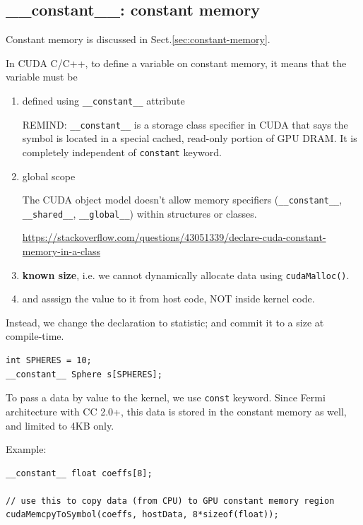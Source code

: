 \subsection{\_\_constant\_\_: constant memory}
\label{sec:cudac_constant}
\label{sec:constant_CUDA-C}
\label{sec:__constant__-CUDA}

Constant memory is discussed in Sect.\ref{sec:constant-memory}.


In CUDA C/C++, to define a variable on constant memory, it means that the variable must be 
\begin{enumerate}
  \item defined using \verb!__constant__! attribute
  
  
REMIND: \verb!__constant__! is a storage class specifier in CUDA that says the
symbol is located in a special cached, read-only portion of GPU DRAM. It is
completely independent of \verb!constant! keyword.
  
  \item global scope

The CUDA object model doesn't allow memory specifiers (\verb!__constant__!, 
\verb!__shared__!, \verb!__global__!) within structures or classes.

\url{https://stackoverflow.com/questions/43051339/declare-cuda-constant-memory-in-a-class}
  
  \item {\bf known size}, i.e. we cannot dynamically allocate data using \verb!cudaMalloc()!.

  \item and asssign the value to it from host code, NOT inside kernel code.

\end{enumerate}
Instead, we change the declaration to statistic; and commit
it to a size at compile-time.
\begin{lstlisting}
int SPHERES = 10;
__constant__ Sphere s[SPHERES];
\end{lstlisting}

To pass a data by value to the kernel, we use \verb!const! keyword. Since Fermi
architecture with CC 2.0+, this data is stored in the constant memory as well,
and limited to 4KB only.

Example:
\begin{lstlisting}
__constant__ float coeffs[8];

// use this to copy data (from CPU) to GPU constant memory region
cudaMemcpyToSymbol(coeffs, hostData, 8*sizeof(float));
\end{lstlisting}

